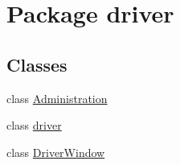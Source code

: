 \hypertarget{namespacedriver}{}\section{Package driver}
\label{namespacedriver}
\subsection*{Classes}
\begin{DoxyCompactItemize}
\item 
class \hyperlink{classdriver_1_1Administration}{Administration}
\item 
class \hyperlink{classdriver_1_1driver}{driver}
\item 
class \hyperlink{classdriver_1_1DriverWindow}{Driver\+Window}
\end{DoxyCompactItemize}

